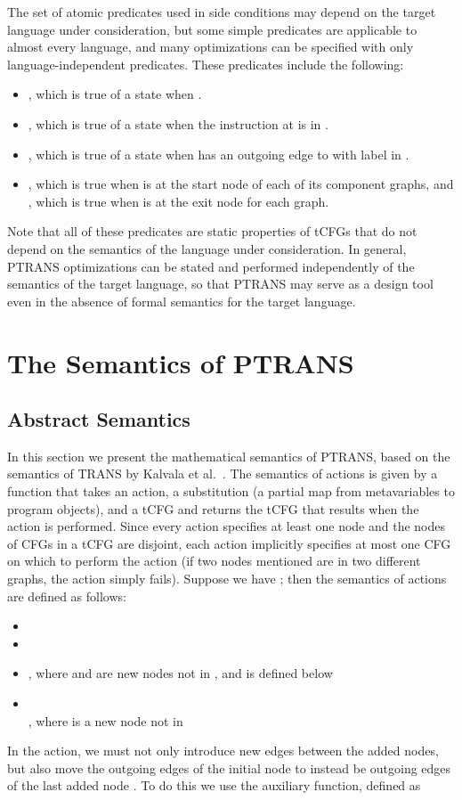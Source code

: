 \documentclass{eptcs}
\newcommand{\ignore}[1]{{}}
\newcommand{\ptrans}[0]{PTRANS}
\begin{document}
\label{preds}
The set of atomic predicates used in side conditions may depend on the target language under consideration, but some simple predicates are applicable to almost every language, and many optimizations can be specified with only language-independent predicates. These predicates include the following:
\begin{itemize}
\item , which is true of a state  when .
\item , which is true of a state  when the instruction at  is  in .
\item , which is true of a state  when  has an outgoing edge to  with label  in .
\item , which is true when  is at the start node of each of its component graphs, and , which is true when  is at the exit node for each graph.
\ignore{\item , which is true when  and  are arithmetic expressions that can be shown to have the same value (independent of program state).}
\end{itemize}
Note that all of these predicates are static properties of \acp{tCFG} that do not depend on the semantics of the language under consideration. In general, {\ptrans} optimizations can be stated and performed independently of the semantics of the target language, so that {\ptrans} may serve as a design tool even in the absence of formal semantics for the target language.

\section{The Semantics of {\ptrans}}
\subsection{Abstract Semantics}
In this section we present the mathematical semantics of PTRANS, based on the semantics of TRANS by Kalvala et al.~\cite{kalvala}. The semantics of actions is given by a function  that takes an action, a substitution (a partial map from metavariables to program objects), and a \ac{tCFG} and returns the \ac{tCFG} that results when the action is performed. Since every action specifies at least one node and the nodes of \acp{CFG} in a \ac{tCFG} are disjoint, each action implicitly specifies at most one \ac{CFG}  on which to perform the action (if two nodes mentioned are in two different graphs, the action simply fails). Suppose we have ; then the semantics of actions are defined as follows:
\begin{itemize}
\item 
\item 
\item , where  and  are new nodes not in , and  is defined below
\item \\, where  is a new node not in 
\end{itemize}
In the  action, we must not only introduce new  edges between the added nodes, but also move the outgoing edges of the initial node  to instead be outgoing edges of the last added node . To do this we use the auxiliary  function, defined as
\end{document}
